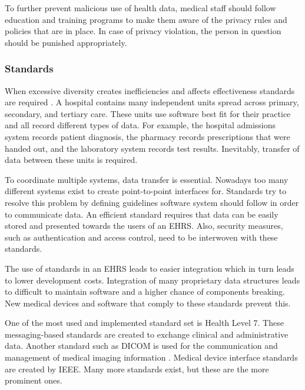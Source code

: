         To further prevent malicious use of health data, medical staff should follow education and training programs to make them aware of the privacy rules and policies that are in place. In case of privacy violation, the person in question should be punished appropriately.

        \subsubsection{Standards} \label{2_standards}

        When excessive diversity creates inefficiencies and affects effectiveness standards are required \cite{biomedical_informatics}. A hospital contains many independent units spread across primary, secondary, and tertiary care. These units use software best fit for their practice and all record different types of data. For example, the hospital admissions system records patient diagnosis, the pharmacy records prescriptions that were handed out, and the laboratory system records test results. Inevitably, transfer of data between these units is required. 

        To coordinate multiple systems, data transfer is essential. Nowadays too many different systems exist to create point-to-point interfaces for. Standards try to resolve this problem by defining guidelines software system should follow in order to communicate data. An efficient standard requires that data can be easily stored and presented towards the users of an EHRS. Also, security measures, such as authentication and access control, need to be interwoven with these standards.

        The use of standards in an EHRS leads to easier integration which in turn leads to lower development costs. Integration of many proprietary data structures leads to difficult to maintain software and a higher chance of components breaking. New medical devices and software that comply to these standards prevent this.

        One of the most used and implemented standard set is Health Level 7. These messaging-based standards are created to exchange clinical and administrative data. Another standard such as DICOM is used for the communication and management of medical imaging information \cite{mildenberger2002introduction}. Medical device interface standards are created by IEEE. Many more standards exist, but these are the more prominent ones.
